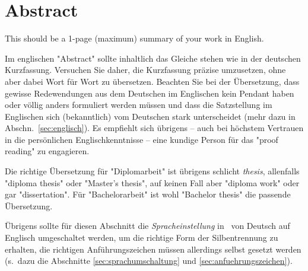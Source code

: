 \chapter{Abstract}

\begin{english} %
This should be a 1-page (maximum) summary of your work in English.
\end{english}

Im englischen "Abstract" sollte inhaltlich das Gleiche stehen wie in der
deutschen Kurzfassung. Versuchen Sie daher, die Kurzfassung prä\-zise
umzusetzen, ohne aber dabei Wort für Wort zu übersetzen. Beachten Sie bei der
Übersetzung, dass gewisse Redewendungen aus dem Deutschen im Englischen kein
Pendant haben oder völlig anders formuliert werden müssen und dass die
Satzstellung im Englischen sich (bekanntlich) vom Deutschen stark unterscheidet
(mehr dazu in Abschn.\ \ref{sec:englisch}). Es empfiehlt sich übrigens --
auch bei höchstem Vertrauen in die persönlichen Englischkenntnisse -- eine
kundige Person für das "proof reading" zu engagieren.

Die richtige Übersetzung für "Diplomarbeit" ist übrigens schlicht
\emph{thesis}, allenfalls  "diploma thesis" oder "Master's thesis", auf
keinen Fall aber "diploma work" oder gar "dissertation". Für "Bachelorarbeit"
ist wohl "Bachelor thesis" die passende Übersetzung.

Übrigens sollte für diesen Abschnitt die \emph{Spracheinstellung} in \latex\
von Deutsch auf Englisch umgeschaltet werden, um die richtige Form der
Silbentrennung zu erhalten, die richtigen Anführungszeichen müssen allerdings
selbst gesetzt werden (s.\ dazu die Abschnitte \ref{sec:sprachumschaltung}
und \ref{sec:anfuehrungszeichen}).
